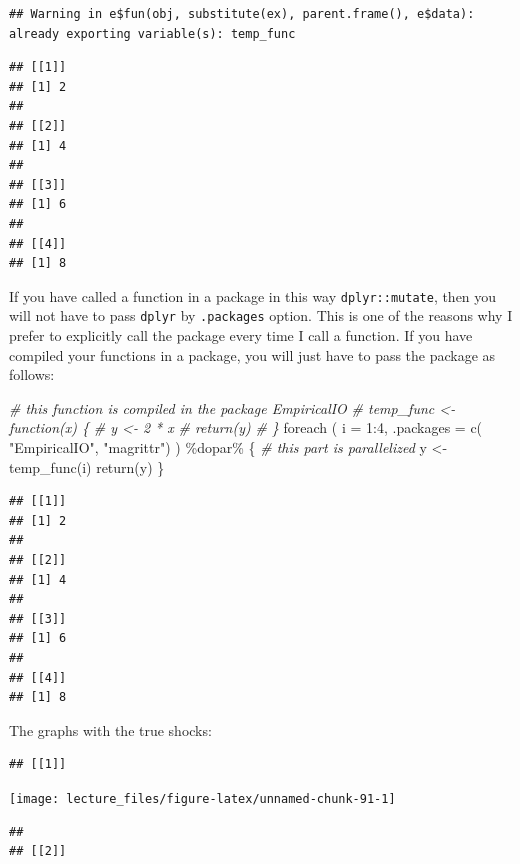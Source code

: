 \documentclass[
]{book}
\newenvironment{Shaded}{\begin{snugshade}}{\end{snugshade}}
\newcommand{\AttributeTok}[1]{\textcolor[rgb]{0.77,0.63,0.00}{#1}}
\newcommand{\CommentTok}[1]{\textcolor[rgb]{0.56,0.35,0.01}{\textit{#1}}}
\newcommand{\DecValTok}[1]{\textcolor[rgb]{0.00,0.00,0.81}{#1}}
\newcommand{\FunctionTok}[1]{\textcolor[rgb]{0.00,0.00,0.00}{#1}}
\newcommand{\NormalTok}[1]{#1}
\newcommand{\OtherTok}[1]{\textcolor[rgb]{0.56,0.35,0.01}{#1}}
\newcommand{\SpecialCharTok}[1]{\textcolor[rgb]{0.00,0.00,0.00}{#1}}
\newcommand{\StringTok}[1]{\textcolor[rgb]{0.31,0.60,0.02}{#1}}
\begin{document}
\begin{verbatim}
## Warning in e$fun(obj, substitute(ex), parent.frame(), e$data): already exporting variable(s): temp_func
\end{verbatim}

\begin{verbatim}
## [[1]]
## [1] 2
## 
## [[2]]
## [1] 4
## 
## [[3]]
## [1] 6
## 
## [[4]]
## [1] 8
\end{verbatim}

If you have called a function in a package in this way \texttt{dplyr::mutate}, then you will not have to pass \texttt{dplyr} by \texttt{.packages} option. This is one of the reasons why I prefer to explicitly call the package every time I call a function. If you have compiled your functions in a package, you will just have to pass the package as follows:

\begin{Shaded}
\begin{Highlighting}[]
\CommentTok{\# this function is compiled in the package EmpiricalIO}
\CommentTok{\# temp\_func \textless{}{-} function(x) \{}
\CommentTok{\#   y \textless{}{-} 2 * x}
\CommentTok{\#   return(y)}
\CommentTok{\# \}}
\FunctionTok{foreach}\NormalTok{ (}
  \AttributeTok{i =} \DecValTok{1}\SpecialCharTok{:}\DecValTok{4}\NormalTok{, }
  \AttributeTok{.packages =} \FunctionTok{c}\NormalTok{(}
    \StringTok{"EmpiricalIO"}\NormalTok{,}
    \StringTok{"magrittr"}\NormalTok{)}
\NormalTok{  ) }\SpecialCharTok{\%dopar\%}\NormalTok{ \{}
    \CommentTok{\# this part is parallelized}
\NormalTok{    y }\OtherTok{\textless{}{-}} \FunctionTok{temp\_func}\NormalTok{(i)}
    \FunctionTok{return}\NormalTok{(y)}
\NormalTok{\}}
\end{Highlighting}
\end{Shaded}

\begin{verbatim}
## [[1]]
## [1] 2
## 
## [[2]]
## [1] 4
## 
## [[3]]
## [1] 6
## 
## [[4]]
## [1] 8
\end{verbatim}

The graphs with the true shocks:

\begin{verbatim}
## [[1]]
\end{verbatim}

\begin{center}\texttt{[image: lecture\_files/figure-latex/unnamed-chunk-91-1]} \end{center}

\begin{verbatim}
## 
## [[2]]
\end{verbatim}
\end{document}
